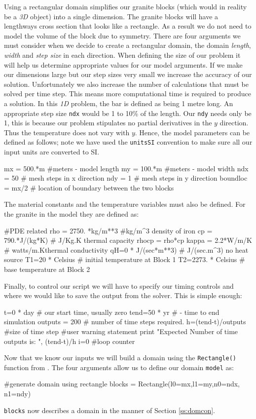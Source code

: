 Using a rectangular domain simplifies our granite blocks (which would in reality
be a \textit{3D} object) into a single dimension. The granite blocks will have a
lengthways cross section that looks like a rectangle.  As a result we do not
need to model the volume of the block due to symmetry. There are four arguments
we must consider when we decide to create a rectangular domain, the domain
\textit{length}, \textit{width} and \textit{step size} in each direction. When
defining the size of our problem it will help us determine appropriate values
for our model arguments. If we make our dimensions large but our step sizes very
small we increase the accuracy of our solution. Unfortunately we also increase
the number of calculations that must be solved per time step. This means more
computational time is required to produce a solution. In this \textit{1D}
problem, the bar is defined as being 1 metre long. An appropriate step size
\verb|ndx| would be 1 to 10\% of the length. Our \verb|ndy| needs only be 1,
this is because our problem stipulates no partial derivatives in the $y$
direction.
Thus the temperature does not vary with $y$. Hence, the model parameters can be
defined as follows; note we have used the \verb|unitsSI| convention to make sure
all our input units are converted to SI.
\begin{python}
mx = 500.*m #meters - model length
my = 100.*m #meters - model width
ndx = 50 # mesh steps in x direction 
ndy = 1 # mesh steps in y direction
boundloc = mx/2 # location of boundary between the two blocks
\end{python}
The material constants and the temperature variables must also be defined. For
the granite in the model they are defined as:
\begin{python}
#PDE related
rho = 2750. *kg/m**3 #kg/m^{3} density of iron
cp = 790.*J/(kg*K) # J/Kg.K thermal capacity
rhocp = rho*cp 
kappa = 2.2*W/m/K   # watts/m.Kthermal conductivity
qH=0 * J/(sec*m**3) # J/(sec.m^{3}) no heat source
T1=20 * Celsius # initial temperature at Block 1
T2=2273. * Celsius # base temperature at Block 2
\end{python}
Finally, to control our script we will have to specify our timing controls and
where we would like to save the output from the solver. This is simple enough:
\begin{python}
t=0 * day  # our start time, usually zero
tend=50 * yr # - time to end simulation
outputs = 200 # number of time steps required.
h=(tend-t)/outputs #size of time step
#user warning statement
print "Expected Number of time outputs is: ", (tend-t)/h
i=0 #loop counter
\end{python}
Now that we know our inputs we will build a domain using the
\verb|Rectangle()| function from \FINLEY. The four arguments allow us to
define our domain \verb|model| as:
\begin{python}
#generate domain using rectangle
blocks = Rectangle(l0=mx,l1=my,n0=ndx, n1=ndy)
\end{python}
\verb|blocks| now describes a domain in the manner of Section \ref{ss:domcon}.

